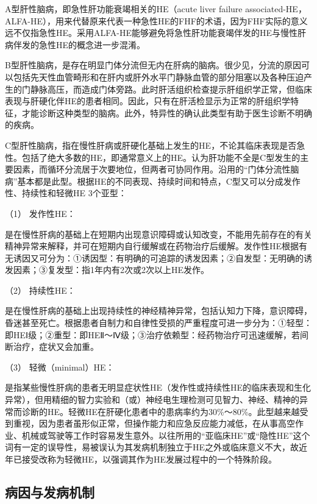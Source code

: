 A型肝性脑病，即急性肝功能衰竭相关的HE（acute liver failure
associated-HE，ALFA-HE），用来代替原来代表一种急性HE的FHF的术语，因为FHF实际的意义远不仅指急性HE。采用ALFA-HE能够避免将急性肝功能衰竭伴发的HE与慢性肝病伴发的急性HE的概念进一步混淆。

B型肝性脑病，是存在明显门体分流但无内在肝病的脑病。很少见，分流的原因可以包括先天性血管畸形和在肝内或肝外水平门静脉血管的部分阻塞以及各种压迫产生的门静脉高压，而造成门体旁路。此时肝活组织检查提示肝组织学正常，但临床表现与肝硬化伴HE的患者相同。因此，只有在肝活检显示为正常的肝组织学特征，才能诊断这种类型的脑病。此外，特异性的确认此类型有助于医生诊断不明确的疾病。

C型肝性脑病，指在慢性肝病或肝硬化基础上发生的HE，不论其临床表现是否急性。包括了绝大多数的HE，即通常意义上的HE。认为肝功能不全是C型发生的主要因素，而循环分流居于次要地位，但两者可协同作用。沿用的“门体分流性脑病”基本都是此型。根据HE的不同表现、持续时间和特点，C型又可以分成发作性、持续性和轻微HE
3个亚型：

\hypertarget{text00101.htmlux5cux23CHP4-3-1}{}
（1） 发作性HE：

是在慢性肝病的基础上在短期内出现意识障碍或认知改变，不能用先前存在的有关精神异常来解释，并可在短期内自行缓解或在药物治疗后缓解。发作性HE根据有无诱因又可分为：①诱因型：有明确的可追踪的诱发因素；②自发型：无明确的诱发因素；③复发型：指1年内有2次或2次以上HE发作。

\hypertarget{text00101.htmlux5cux23CHP4-3-2}{}
（2） 持续性HE：

是在慢性肝病的基础上出现持续性的神经精神异常，包括认知力下降，意识障碍，昏迷甚至死亡。根据患者自制力和自律性受损的严重程度可进一步分为：①轻型：即HEⅠ级；②重型：即HEⅡ～Ⅳ级；③治疗依赖型：经药物治疗可迅速缓解，若间断治疗，症状又会加重。

\hypertarget{text00101.htmlux5cux23CHP4-3-3}{}
（3） 轻微（minimal）HE：

是指某些慢性肝病的患者无明显症状性HE（发作性或持续性HE的临床表现和生化异常），但用精细的智力实验和（或）神经电生理检测可见智力、神经、精神的异常而诊断的HE。轻微HE在肝硬化患者中的患病率约为30\%～80\%。此型越来越受到重视，因为患者虽形似正常，但操作能力和应急反应能力减低，在从事高空作业、机械或驾驶等工作时容易发生意外。以往所用的“亚临床HE”或“隐性HE”这个词有一定的误导性，易被误认为其发病机制独立于HE之外或临床意义不大，故近年已接受改称为轻微HE，以强调其作为HE发展过程中的一个特殊阶段。

\subsection{病因与发病机制}

